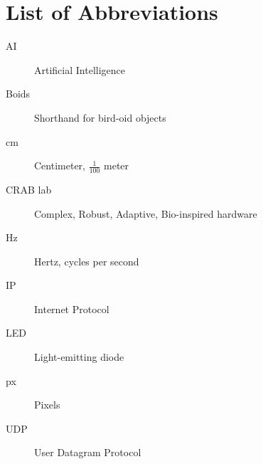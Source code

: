 \chapter*{List of Abbreviations}

\begin{description}
  \item[AI] Artificial Intelligence
  \item[Boids] Shorthand for bird-oid objects
  \item[cm] Centimeter, $\frac{1}{100}$ meter
  \item[CRAB lab] Complex, Robust, Adaptive, Bio-inspired hardware
  \item[Hz] Hertz, cycles per second
  \item[IP] Internet Protocol
  \item[LED] Light-emitting diode
  \item[px] Pixels
  \item[UDP] User Datagram Protocol
\end{description}
